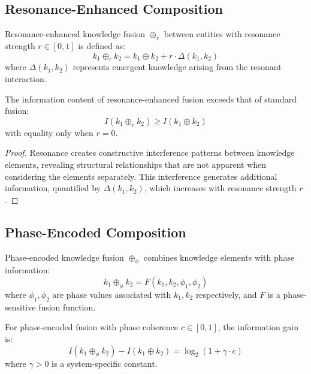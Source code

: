 \subsection{Resonance-Enhanced Composition}

\begin{definition}
Resonance-enhanced knowledge fusion $\oplus_r$ between entities with resonance strength $r \in [0, 1]$ is defined as:
\begin{equation}
k_1 \oplus_r k_2 = k_1 \oplus k_2 + r \cdot \Delta(k_1, k_2)
\end{equation}
where $\Delta(k_1, k_2)$ represents emergent knowledge arising from the resonant interaction.
\end{definition}

\begin{theorem}
The information content of resonance-enhanced fusion exceeds that of standard fusion:
\begin{equation}
I(k_1 \oplus_r k_2) \geq I(k_1 \oplus k_2)
\end{equation}
with equality only when $r = 0$.
\end{theorem}

\begin{proof}
Resonance creates constructive interference patterns between knowledge elements, revealing structural relationships that are not apparent when considering the elements separately. This interference generates additional information, quantified by $\Delta(k_1, k_2)$, which increases with resonance strength $r$.
\end{proof}

\subsection{Phase-Encoded Composition}

\begin{definition}
Phase-encoded knowledge fusion $\oplus_\phi$ combines knowledge elements with phase information:
\begin{equation}
k_1 \oplus_\phi k_2 = F(k_1, k_2, \phi_1, \phi_2)
\end{equation}
where $\phi_1, \phi_2$ are phase values associated with $k_1, k_2$ respectively, and $F$ is a phase-sensitive fusion function.
\end{definition}

\begin{theorem}
For phase-encoded fusion with phase coherence $c \in [0, 1]$, the information gain is:
\begin{equation}
I(k_1 \oplus_\phi k_2) - I(k_1 \oplus k_2) = \log_2(1 + \gamma \cdot c)
\end{equation}
where $\gamma > 0$ is a system-specific constant.
\end{theorem}

